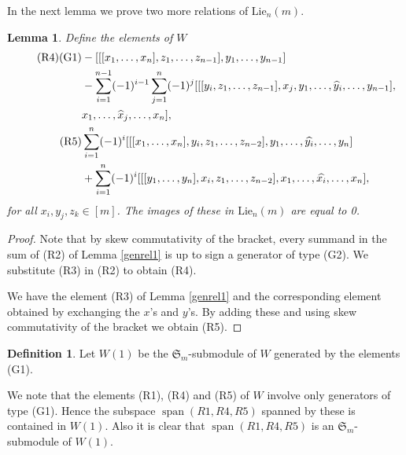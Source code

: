 \documentclass[11pt]{amsart}
\newtheorem{lem}[thm]{Lemma}
\theoremstyle{definition}
\newtheorem{defn}[thm]{Definition}
\numberwithin{equation}{section}
\DeclareMathOperator{\spn}{span}
\begin{document}
In the next lemma we prove two more relations of $\text{Lie}_n(m)$.

\begin{lem}\label{R5} Define the elements of $W$
	\begin{align}\tag{R4}\textup{(G1)}&-[[[{x_1},\dots ,{x_n} ],{z_{1}},\dots, z_{n-1}], y_{1},\dots ,y_{n-1}]\\\nonumber&-\sum_{i=1}^{n-1}(-1)^{i-1}\sum_{j=1}^n(-1)^j[[[y_{i},z_1, \dots, z_{n-1}],x_j,y_1,\dots,\widehat{y}_{i}, \dots, y_{n-1}],\\&\nonumber x_1, \dots, \widehat{x}_j, \dots, x_n],\\\tag{R5}
		&\sum_{i=1}^{n}(-1)^{i}[[[x_1,\dots,x_n],y_i, z_1,\dots,z_{n-2}],y_1,\dots, \widehat{y_{i}}, \dots, y_n] \\\nonumber&+ \sum_{i=1}^{n}(-1)^{i}[[[y_1,\dots,y_n],x_i, z_1,\dots,z_{n-2}],x_1,\dots, \widehat{x_{i}}, \dots, x_n],
	\end{align}
	for all $x_i, y_j, z_k \in [m]$. The images of these in $\text{Lie}_n(m)$ are equal to 0.
\end{lem}
\begin{proof}
	Note that  by skew commutativity of the bracket, every summand in the sum of (R2) of Lemma \ref{genrel1} is up to sign  a generator of type (G2). We substitute (R3) in (R2) to obtain (R4).
	
	We have the element (R3) of Lemma \ref{genrel1} and the corresponding element obtained by exchanging the $x$'s and $y$'s. By adding these and using skew commutativity of the bracket we obtain (R5).\end{proof}


\begin{defn} Let $W(1)$ be the $\mathfrak{S}_m$-submodule of $W$ generated by the elements (G1).
\end{defn}

We note that the elements (R1), (R4) and (R5) of $W$ involve only generators of type (G1). Hence the subspace $\spn(R1,R4,R5)$ spanned by these is contained in $W(1)$. Also it is clear that $\spn(R1,R4,R5)$ is an $\mathfrak{S}_m$-submodule of $W(1)$.
\end{document}
